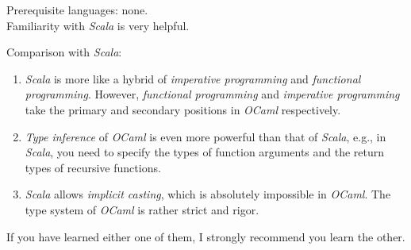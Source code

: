 \documentclass{article}
\begin{document}
\begin{itemize}
    Prerequisite languages: none.\\
    Familiarity with \emph{Scala} is very helpful.
    
    Comparison with \emph{Scala}:
    \begin{enumerate}
        \item \emph{Scala} is more like a hybrid of \emph{imperative programming} and \emph{functional programming}.
        However, \emph{functional programming} and \emph{imperative programming} take the primary and secondary positions in \emph{OCaml} respectively.
        
        \item \emph{Type inference} of \emph{OCaml} is even more powerful than that of \emph{Scala}, e.g., in \emph{Scala}, you need to specify the types of function arguments and the return types of recursive functions.
        
        \item \emph{Scala} allows \emph{implicit casting}, which is absolutely impossible in \emph{OCaml}.
        The type system of \emph{OCaml} is rather strict and rigor.
    \end{enumerate}
    If you have learned either one of them, I strongly recommend you learn the other.
    

\end{itemize}
\end{document}
